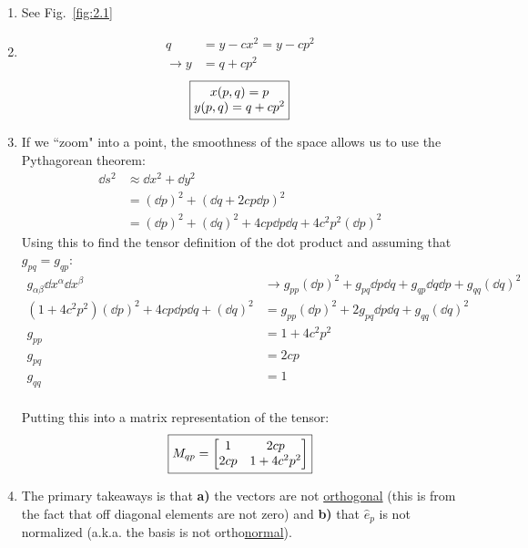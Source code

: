 \documentclass[11pt]{article}
\begin{document}
\begin{enumerate}[label=\alph*)]
\item See Fig.~\ref{fig:2.1}
\item 
\begin{align*}
q &= y -cx^2 = y-cp^2 \\
\rightarrow y &= q+ cp^2
\end{align*}
\[\boxed{\mqty{x(p,q) = p \\ y(p,q) = q + cp^2}}\]
\item 
If we ``zoom" into a point, the smoothness of the space allows us to use the Pythagorean theorem:
\begin{align*}
\dd{s^2} & \approx \dd{x^2} + \dd{y^2}\\
&= \left(\dd{p}\right)^2 + \left(\dd{q} + 2cp \dd{p}\right)^2\\
&= \left(\dd{p}\right)^2 + \left(\dd{q}\right)^2 + 4cp\dd{p}\dd{q} + 4c^2 p^2 \left(\dd{p}\right)^2
\end{align*}
Using this to find the tensor definition of the dot product and assuming that $g_{pq} = g_{qp}$:
\begin{align*}
g_{\alpha \beta} \dd{x}^\alpha \dd{x}^\beta & \rightarrow g_{pp}\left(\dd{p}\right)^2 + g_{pq}\dd{p}\dd{q} + g_{qp} \dd{q} \dd{p} + g_{qq} \left(\dd{q}\right)^2\\
\left(1 + 4c^2p^2\right)\left(\dd{p}\right)^2 + 4cp\dd{p}\dd{q} + \left(\dd{q}\right)^2 & = g_{pp}\left(\dd{p}\right)^2 + 2g_{pq}\dd{p}\dd{q} + g_{qq} \left(\dd{q}\right)^2\\
g_{pp} & = 1 + 4c^2p^2\\
g_{pq} & = 2cp\\
g_{qq} & = 1 \\
\end{align*}
 
Putting this into a matrix representation of the tensor:
\[\boxed{M_{qp} = \mqty[1 & 2cp \\ 2cp & 1+4c^2p^2]}\]

\item
The primary takeaways is that {\bf a)} the vectors are not \underline{orthogonal} (this is from the fact that off diagonal elements are not zero) and {\bf b)} that $\hat{e}_p$ is not normalized (a.k.a. the basis is not ortho\underline{normal}).

\end{enumerate}
\end{document}
